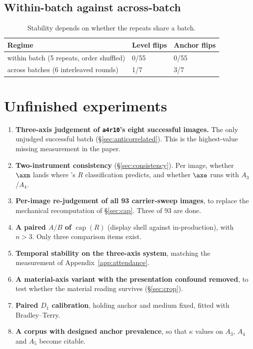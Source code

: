 \subsection{Within-batch against across-batch}

\begin{table}[H]
\centering\small
\begin{tabular}{@{}lll@{}}
\toprule
Regime & Level flips & Anchor flips \\
\midrule
within batch (5 repeats, order shuffled) & 0/55 & 0/55 \\
across batches (6 interleaved rounds) & 1/7 & 3/7 \\
\bottomrule
\end{tabular}
\caption{Stability depends on whether the repeats share a batch.}
\label{tab:batchcomp}
\end{table}

\section{Unfinished experiments}
\label{app:todo}

\begin{enumerate}
  \item \textbf{Three-axis judgement of \texttt{a4r10}'s eight successful
  images.} The only unjudged successful batch (\S\ref{sec:anticorrelated}).
  This is the highest-value missing measurement in the paper.
  \item \textbf{Two-instrument consistency} (\S\ref{sec:consistency}). Per
  image, whether $\axm$ lands where \sexl's $R$ classification predicts, and
  whether $\axe$ runs with $A_3$/$A_4$.
  \item \textbf{Per-image re-judgement of all 93 carrier-sweep images}, to
  replace the mechanical recomputation of \S\ref{sec:cap}. Three of 93 are
  done.
  \item \textbf{A paired $A/B$ of $\operatorname{cap}(R)$} (display shell
  against in-production), with $n>3$. Only three comparison items exist.
  \item \textbf{Temporal stability on the three-axis system}, matching the
  \sexl{} measurement of Appendix~\ref{app:attendance}.
  \item \textbf{A material-axis variant with the presentation confound
  removed}, to test whether the material reading survives
  (\S\ref{sec:crop}).
  \item \textbf{Paired $D_1$ calibration}, holding anchor and medium fixed,
  fitted with Bradley--Terry.
  \item \textbf{A corpus with designed anchor prevalence}, so that $\kappa$
  values on $A_3$, $A_4$ and $A_5$ become citable.
\end{enumerate}

